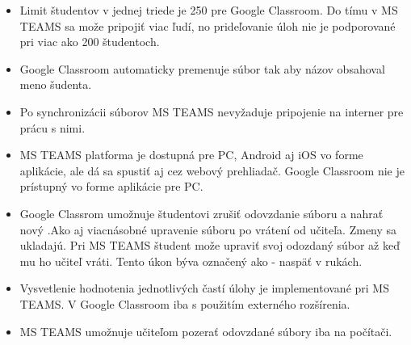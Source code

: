 \documentclass[10pt,slovak,a4paper]{article}
\begin{document}
\begin{itemize}
	\item Limit študentov v jednej triede je 250 pre Google Classroom.  Do tímu v MS TEAMS sa može pripojiť viac ľudí, no prideľovanie úloh nie je podporované pri viac ako 200 študentoch.
	\item Google Classroom automaticky premenuje súbor tak aby názov obsahoval meno šudenta.
	\item Po synchronizácii súborov MS TEAMS nevyžaduje pripojenie na interner pre prácu s nimi.	
	\item MS TEAMS platforma je dostupná pre PC, Android aj iOS vo forme aplikácie, ale dá sa spustiť aj cez webový prehliadač. Google Classroom nie je prístupný vo forme aplikácie pre PC.
	\item Google Classrom umožnuje študentovi zrušiť odovzdanie súboru a nahrať nový .Ako aj viacnásobné upravenie súboru po vrátení od učiteľa. Zmeny sa ukladajú. Pri MS TEAMS študent može upraviť svoj odozdaný súbor až keď mu ho učiteľ vráti. Tento úkon býva označený ako - naspäť v rukách.
	\item Vysvetlenie hodnotenia jednotlivých častí úlohy je implementované pri MS TEAMS. V Google Classroom iba s použitím externého rozšírenia.
	\item MS TEAMS umožnuje učiteľom pozerať odovzdané súbory iba na počítači.\cite{porovnanie}

	
\end{itemize}









\end{document}
